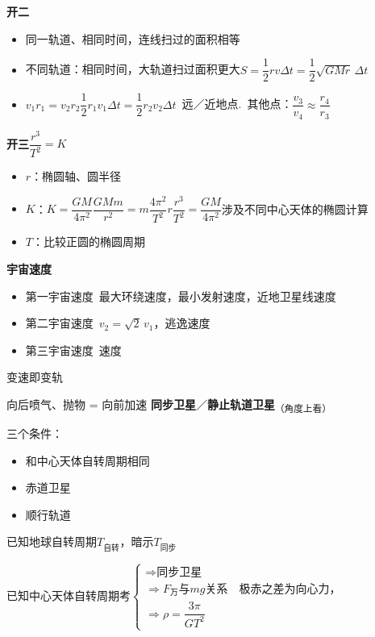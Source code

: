 \textbf{开二}
\begin{itemize}
\item 同一轨道、相同时间，连线扫过的面积相等
\item 不同轨道：相同时间，大轨道扫过面积更大\quad $S=\dfrac{1}{2}rv\Delta t=\dfrac{1}{2}\sqrt{GMr}\,\Delta t$
\item $v_1r_1=v_2r_2$\quad $\dfrac{1}{2}r_1v_1\Delta t=\dfrac{1}{2}r_2v_2\Delta t$\ 远／近地点.\ 其他点：$\dfrac{v_3}{v_4}\approx\dfrac{r_4}{r_3}$
\end{itemize}

\textbf{开三}\quad $\dfrac{r^{3}}{T^{2}}=K$
\begin{itemize}
\item $r$：椭圆轴、圆半径
\item $K$：$K=\dfrac{GM}{4\pi^{2}}$\quad $\dfrac{GMm}{r^{2}}=m\dfrac{4\pi^{2}}{T^{2}}r$\quad $\dfrac{r^{3}}{T^{2}}=\dfrac{GM}{4\pi^{2}}$\quad 涉及不同中心天体的椭圆计算
\item $T$：比较正圆的椭圆周期
\end{itemize}
\textbf{宇宙速度}
\begin{itemize}
\item 第一宇宙速度\ 最大环绕速度，最小发射速度，近地卫星线速度
\item 第二宇宙速度\ $v_2=\sqrt{2}\,v_1$，逃逸速度
\item 第三宇宙速度\ 速度
\end{itemize}
变速即变轨

向后喷气、抛物 = 向前加速
\textbf{同步卫星}／\textbf{静止轨道卫星}\textsubscript{（角度上看）}

三个条件：
\begin{itemize}
\item 和中心天体自转周期相同
\item 赤道卫星
\item 顺行轨道
\end{itemize}

已知地球自转周期$T_{\text{自转}}$，暗示$T_{\text{同步}}$%

已知中心天体自转周期\quad 考$\left\{\begin{array}{l}
\Rightarrow\text{同步卫星}\\
\Rightarrow F_{\text{万}}\text{与}mg\text{关系}\quad\text{极赤之差为向心力，}\\
\Rightarrow\rho=\dfrac{3\pi}{GT^{2}}
\end{array}\right.$
